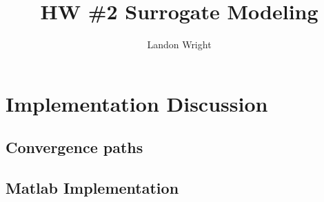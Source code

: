 \documentclass{article}
\begin{document}
\singlespacing
\title{HW \#2 Surrogate Modeling}
\author{Landon Wright}
\maketitle
\section{Implementation Discussion}






\subsection{Convergence paths}

\subsection{Matlab Implementation}
\inputminted[xleftmargin=10pt, linenos]{matlab}{simAnneal.m}
\end{document}
